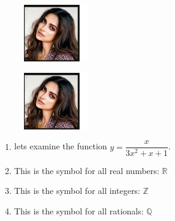 \documentclass[12pt,a4paper]{article}
\def\eq1{y=\dfrac{x}{3x^2+x+1}}
\newcommand{\set}[1]{\setlength\itemsep{#1em}}
\begin{document}
\begin{figure}[b]
\includegraphics[scale=0.2,width=0.25\textwidth]{deepulook}
\end{figure}
\begin{figure}[t]
\includegraphics[scale=0.2,width=0.25\textwidth]{deepulook}
\end{figure}
\begin{enumerate}
\set{1.2}
    \item lets examine the function $\eq1$.
    \item This is the symbol for all real numbers: $\mathbb{R}$
    \item This is the symbol for all integers: $\mathbb{Z}$
    \item This is the symbol for all rationals: $\mathbb{Q}$
\end{enumerate}
\end{document}
